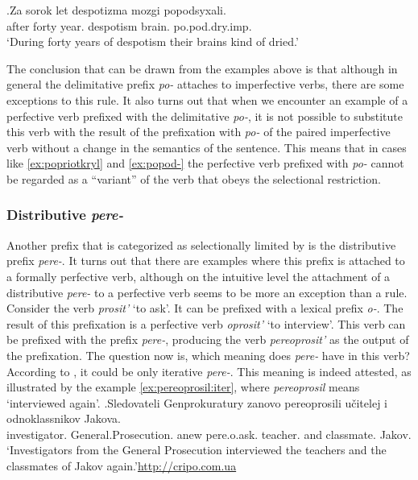 \exg.\label{ex:popod-imp}Za sorok let despotizma mozgi popodsyxali.\\
after forty year. despotism brain. po.pod.dry.imp.\\
\trans `During forty years of despotism their brains kind of dried.'

The conclusion that can be drawn from the examples above is that although in general the delimitative prefix \textit{po-} attaches to imperfective verbs, there are some exceptions to this rule. It also turns out that when we encounter an example of a perfective verb prefixed with the delimitative \textit{po-}, it is not possible to substitute this verb with the result of the prefixation with \textit{po-} of the paired imperfective verb without a change in the semantics of the sentence. This means that in cases like \ref{ex:popriotkryl} and \ref{ex:popod-} the perfective verb prefixed with \textit{po-} cannot be regarded as a ``variant'' of the verb that obeys the selectional restriction.
 
\subsubsection{Distributive \textit{pere-}}
Another prefix that is categorized as selectionally limited by \citet{Tatevosov:09} is the distributive prefix \textit{pere-}. It turns out that there are examples where this prefix is attached to a formally perfective verb, although on the intuitive level the attachment of a distributive \textit{pere-} to a perfective verb seems to be more an exception than a rule. Consider the verb \textit{prosit'}\textsuperscript{\IPF} `to ask'. It can be prefixed with a lexical prefix \textit{o-}. The result of this prefixation is a perfective verb \textit{oprosit'}\textsuperscript{\PF} `to interview'. This verb can be prefixed with the prefix \textit{pere-}, producing the verb \textit{pereoprosit'}\textsuperscript{\PF} as the output of the prefixation. The question now is, which meaning does \textit{pere-} have in this verb? According to \citet{Tatevosov:09}, it could be only iterative \textit{pere-}. This meaning is indeed attested, as illustrated by the example \ref{ex:pereoprosil:iter}, where \textit{pereoprosil} means `interviewed again'.
\exg.\label{ex:pereoprosil:iter}Sledovateli Genprokuratury zanovo pereoprosili u\v{c}itelej i odnoklassnikov Jakova.\\
investigator. General.Prosecution. anew pere.o.ask. teacher. and classmate. Jakov.\\
\trans `Investigators from the General Prosecution interviewed the teachers and the classmates of Jakov again.'\hbox{}\hfill\hbox{\url{http://cripo.com.ua}}

